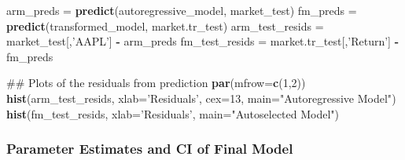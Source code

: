 \documentclass[]{article}
\newenvironment{Shaded}{\begin{snugshade}}{\end{snugshade}}
\newcommand{\KeywordTok}[1]{\textcolor[rgb]{0.13,0.29,0.53}{\textbf{#1}}}
\newcommand{\DataTypeTok}[1]{\textcolor[rgb]{0.13,0.29,0.53}{#1}}
\newcommand{\DecValTok}[1]{\textcolor[rgb]{0.00,0.00,0.81}{#1}}
\newcommand{\StringTok}[1]{\textcolor[rgb]{0.31,0.60,0.02}{#1}}
\newcommand{\OtherTok}[1]{\textcolor[rgb]{0.56,0.35,0.01}{#1}}
\newcommand{\OperatorTok}[1]{\textcolor[rgb]{0.81,0.36,0.00}{\textbf{#1}}}
\newcommand{\NormalTok}[1]{#1}
\begin{document}
\begin{Shaded}
\begin{Highlighting}[]
\NormalTok{arm_preds =}\StringTok{ }\KeywordTok{predict}\NormalTok{(autoregressive_model, market_test) }
\NormalTok{fm_preds =}\StringTok{ }\KeywordTok{predict}\NormalTok{(transformed_model, market.tr_test)}
\NormalTok{arm_test_resids =}\StringTok{ }\NormalTok{market_test[,}\StringTok{'AAPL'}\NormalTok{] }\OperatorTok{-}\StringTok{ }\NormalTok{arm_preds}
\NormalTok{fm_test_resids =}\StringTok{ }\NormalTok{market.tr_test[,}\StringTok{'Return'}\NormalTok{] }\OperatorTok{-}\StringTok{ }\NormalTok{fm_preds}

\NormalTok{## Plots of the residuals from prediction}
\KeywordTok{par}\NormalTok{(}\DataTypeTok{mfrow=}\KeywordTok{c}\NormalTok{(}\DecValTok{1}\NormalTok{,}\DecValTok{2}\NormalTok{))}
\KeywordTok{hist}\NormalTok{(arm_test_resids, }\DataTypeTok{xlab=}\StringTok{'Residuals'}\NormalTok{, }\DataTypeTok{cex=}\DecValTok{13}\NormalTok{,}
     \DataTypeTok{main=}\StringTok{"Autoregressive Model"}\NormalTok{)}
\KeywordTok{hist}\NormalTok{(fm_test_resids, }\DataTypeTok{xlab=}\StringTok{'Residuals'}\NormalTok{,}
     \DataTypeTok{main=}\StringTok{"Autoselected Model"}\NormalTok{)}
\end{Highlighting}
\end{Shaded}

\subsubsection{Parameter Estimates and CI of Final
Model}\label{parameter-estimates-and-ci-of-final-model}

\begin{Shaded}
\end{Shaded}
\end{document}
